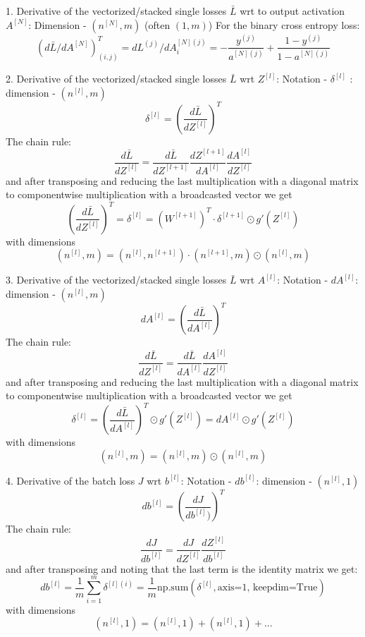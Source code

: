 \documentclass[10pt,a4paper]{article}
\begin{document}
1. Derivative of the vectorized/stacked  single losses $\bar L$ wrt to output activation $A^{[N]}$: Dimension - $(n^{[N]}, m) $   (often $(1, m) $)
For the binary cross entropy loss: 
\[(d\bar L / d A^{[N]})^T_{(i,j)} =  dL^{(j)}/dA^{[N](j)}_i = -\frac{y^{(j) }}{a^{[N](j)}} + \frac{1-y^{(j) }}{1-a^{[N](j)}}  \]

2.  Derivative of the vectorized/stacked  single losses $\bar L$ wrt $Z^{[l]}$: Notation - $\delta^{[l]}$ : dimension - $(n^{[l]}, m) $   
\[\delta^{[l]} = \left (\frac{d\bar L }{ d Z^{[l]}} \right)^T \]
The chain rule:
\[   \frac{d\bar L }{ d Z^{[l]}} = \frac{d\bar L }{ d Z^{[l+1]}} \frac{d Z^{[l+1]} }{ d A^{[l]}}\frac{d A^{[l]} }{ d Z^{[l]}}  \]
and after transposing and reducing the last multiplication with a diagonal matrix to componentwise multiplication with a broadcasted  vector  we get 
\[ \left (\frac{d\bar L }{ d Z^{[l]}} \right)^T   = \delta^{[l]}  =  (W^{[l+1]})^T \cdot \delta^{[l+1]}  \odot g'(Z^{[l]})   \]
with dimensions 
\[ (n^{[l]},m) = (n^{[l]},n^{[l+1]}) \cdot  (n^{[l+1]}, m) \odot (n^{[l]},m) \]

3. Derivative of the vectorized/stacked  single losses $\bar L$   wrt $A^{[l]}$: Notation - $dA^{[l]} $: dimension - $(n^{[l]}, m) $   
\[dA^{[l]} = \left (\frac{d\bar L }{ d A^{[l]}} \right)^T \]
The chain rule:
\[   \frac{d\bar L }{ d Z^{[l]}} = \frac{d\bar L }{ d A^{[l]}} \frac{d A^{[l]} }{  d Z^{[l]}} \]
and after transposing and reducing the last multiplication with a diagonal matrix to componentwise multiplication with a broadcasted  vector  we get 
\[ \delta^{[l]} = \left (\frac{d\bar L }{ d A^{[l]}} \right)^T \odot g'(Z^{[l]})  =  dA^{[l]} \odot g'(Z^{[l]})   \]
with dimensions 
\[ (n^{[l]},m) = (n^{[l]},m)  \odot (n^{[l]},m) \]

4.  Derivative of the batch loss  $J$ wrt $b^{[l]}$: Notation - $db^{[l]} $:  dimension -  $(n^{[l]}, 1) $   
\[db^{[l]} = \left (\frac{d J }{ d b^{[l]})} \right)^T \]
The chain rule:
\[   \frac{d J }{ d b^{[l]}} = \frac{d J }{ d Z^{[l]}} \frac{d Z^{[l]} }{  d b^{[l]}} \]
and after transposing and noting that the last term is the identity matrix we get: 
\[ db^{[l]} =  \frac{1}{m}\sum_{i=1}^{m}\delta^{[l](i)} = \frac{1}{m}\text{np.sum}(\delta^{[l]}, \text{axis=1, keepdim=True})    \]
with dimensions 
\[ (n^{[l]},1) = (n^{[l]},1)  + (n^{[l]},1) + \dots  \]
\end{document}
